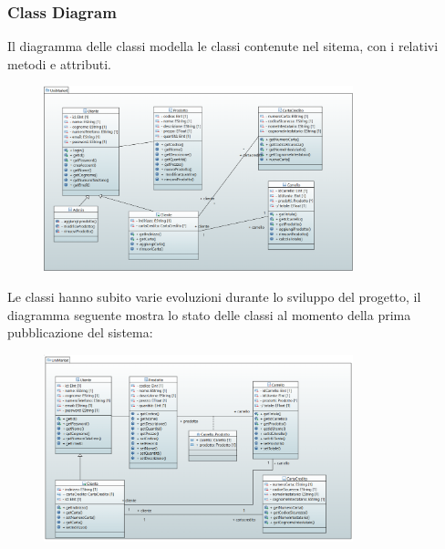 \documentclass[a4paper,12pt]{article}
\begin{document}
\subsubsection{Class Diagram}
Il diagramma delle classi modella le classi contenute nel sitema, con i relativi metodi e attributi.
\begin{figure}[H]
    \centering
    \includegraphics[width=0.8\textwidth]{../UML/UML png/ClassDiagram.png}
    \label{fig:Class Diagram}
\end{figure}
Le classi hanno subito varie evoluzioni durante lo sviluppo del progetto, il diagramma seguente mostra lo stato delle classi al momento della prima pubblicazione del sistema:
\begin{figure}[H]
    \centering
    \includegraphics[width=0.8\textwidth]{../UML/UML png/ClassDiagram2.png}
    \label{fig:Class Diagram effettivo}
\end{figure}
\end{document}
